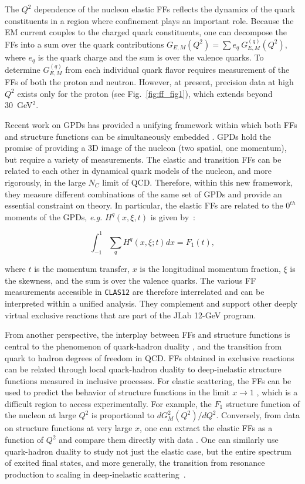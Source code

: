 The $Q^2$ dependence of the nucleon elastic FFs reflects the dynamics of 
the quark constituents in a region where confinement plays an important 
role.  Because the EM current couples to the charged quark constituents, 
one can decompose the FFs into a sum over the quark contributions 
$G_{E,M}(Q^2) = \sum e_q\ G^{(q)}_{E,M}(Q^2)$, where $e_q$ is the quark 
charge and the sum is over the valence quarks.  To determine 
$G^{(q)}_{E,M}$ from each individual quark flavor requires measurement of 
the FFs of both the proton and neutron. However, at present, precision 
data at high $Q^2$ exists only for the proton (see Fig.~\ref{fig:ff_fig1}), 
which extends beyond 30~GeV$^2$.  

Recent work on GPDs has provided a unifying framework within which both 
FFs and structure functions can be simultaneously embedded
\cite{JI,Radyushkin:1997ki}.  
GPDs hold the promise of providing a 3D image of the nucleon (two spatial, 
one momentum), but require a variety of measurements.  The elastic and 
transition FFs can be related to each other in dynamical quark models of 
the nucleon, and more rigorously, in the large $N_C$ limit of QCD. 
Therefore, within this new framework, they measure different combinations 
of the same set of GPDs and provide an essential constraint on theory.  In 
particular, the elastic FFs are related to the $0^{th}$ moments of the 
GPDs, {\it e.g.} $H^q(x,\xi,t)$ is given by~\cite{JI}:

\begin{equation}
\int_{-1}^1 \sum_q H^q(x,\xi;t) dx = F_1(t),
\end{equation}

\noindent
where $t$ is the momentum transfer, $x$ is the longitudinal momentum 
fraction, $\xi$ is the skewness, and the sum is over the valence quarks.
The various FF measurements accessible in {\tt CLAS12} are therefore 
interrelated and can be interpreted within a unified analysis.  They 
complement and support other deeply virtual exclusive reactions that 
are part of the JLab 12-GeV program.

From another perspective, the interplay between FFs and structure 
functions is central to the phenomenon of quark-hadron duality
\cite{BG,Niculescu:2000tk,RUJ,JU,JM}, and the transition from quark to 
hadron degrees
of freedom in QCD.  FFs obtained in exclusive reactions can be related 
through local quark-hadron duality to deep-inelastic structure functions 
measured in inclusive processes.  For elastic scattering, the FFs can be 
used to predict the behavior of structure functions in the limit $x \to 1$
\cite{BG,DY,WEST,MEL}, which is a difficult region to access experimentally.  
For example, the $F_1$ structure function of the nucleon at large $Q^2$ 
\cite{BG,MEL} is proportional to $dG_M^2(Q^2) / dQ^2$.  Conversely, from 
data on structure functions at very large $x$, one can extract the elastic 
FFs as a function of $Q^2$ and compare them directly with data
\cite{Niculescu:2000tk,RUJ}.  One can similarly use quark-hadron duality 
to study not 
just the elastic case, but the entire spectrum of excited final states, 
and more generally, the transition from resonance production to scaling in 
deep-inelastic scattering~\cite{CM}.  

